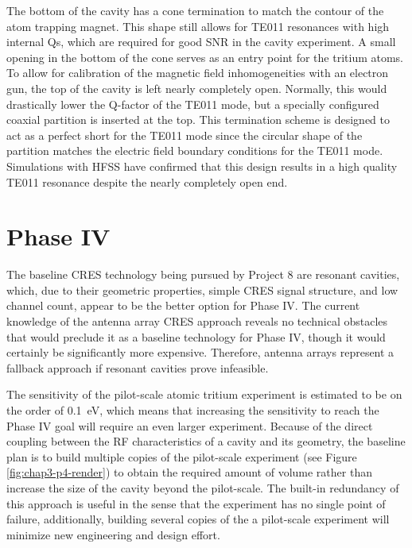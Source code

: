 The bottom of the cavity has a cone termination to match the contour of the atom trapping magnet. This shape still allows for TE011 resonances with high internal Qs, which are required for good SNR in the cavity experiment. A small opening in the bottom of the cone serves as an entry point for the tritium atoms. To allow for calibration of the magnetic field inhomogeneities with an electron gun, the top of the cavity is left nearly completely open. Normally, this would drastically lower the Q-factor of the TE011 mode, but a specially configured coaxial partition is inserted at the top. This termination scheme is designed to act as a perfect short for the TE011 mode since the circular shape of the partition matches the electric field boundary conditions for the TE011 mode. Simulations with HFSS have confirmed that this design results in a high quality TE011 resonance despite the nearly completely open end.

\section{Phase IV}

The baseline CRES technology being pursued by Project 8 are resonant cavities, which, due to their geometric properties, simple CRES signal structure, and low channel count, appear to be the better option for Phase IV. The current knowledge of the antenna array CRES approach reveals no technical obstacles that would preclude it as a baseline technology for Phase IV, though it would certainly be significantly more expensive. Therefore, antenna arrays represent a fallback approach if resonant cavities prove infeasible.

The sensitivity of the pilot-scale atomic tritium experiment is estimated to be on the order of 0.1~eV, which means that increasing the sensitivity to reach the Phase IV goal will require an even larger experiment. Because of the direct coupling between the RF characteristics of a cavity and its geometry, the baseline plan is to build multiple copies of the pilot-scale experiment (see Figure \ref{fig:chap3-p4-render}) to obtain the required amount of volume rather than increase the size of the cavity beyond the pilot-scale. The built-in redundancy of this approach is useful in the sense that the experiment has no single point of failure, additionally, building several copies of the a pilot-scale experiment will minimize new engineering and design effort.

